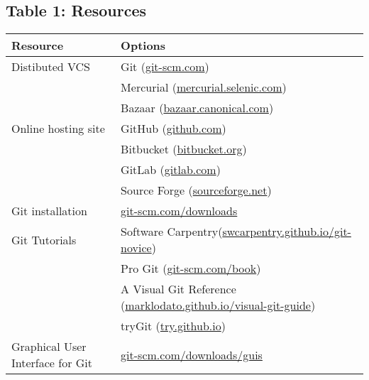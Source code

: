 \subsection{Table 1: Resources}

\begin{tabular}{|l|l|}
    \hline
    \textbf{Resource} & \textbf{Options} \\ \hline
    Distibuted VCS & Git (\href{https://git-scm.com}{git-scm.com}) \\ \hline
                   & Mercurial (\href{https://mercurial.selenic.com}{mercurial.selenic.com}) \\ \hline
                   & Bazaar (\href{http://bazaar.canonical.com}{bazaar.canonical.com}) \\ \hline
    Online hosting site & GitHub (\href{https://github.com}{github.com}) \\ \hline
                        & Bitbucket (\href{https://bitbucket.org}{bitbucket.org}) \\ \hline
                        & GitLab (\href{https://about.gitlab.com}{gitlab.com}) \\ \hline
                        & Source Forge (\href{http://sourceforge.net}{sourceforge.net}) \\ \hline
    Git installation & \href{https://git-scm.com/downloads}{git-scm.com/downloads} \\ \hline
    Git Tutorials & Software Carpentry(\href{https://swcarpentry.github.io/git-novice}{swcarpentry.github.io/git-novice}) \\ \hline
                  & Pro Git (\href{https://git-scm.com/book}{git-scm.com/book}) \\ \hline
                  & A Visual Git Reference (\href{https://marklodato.github.io/visual-git-guide}{marklodato.github.io/visual-git-guide}) \\ \hline
                  & tryGit (\href{https://try.github.io}{try.github.io}) \\ \hline
    Graphical User Interface for Git & \href{https://git-scm.com/downloads/guis}{git-scm.com/downloads/guis} \\ \hline
\end{tabular}
